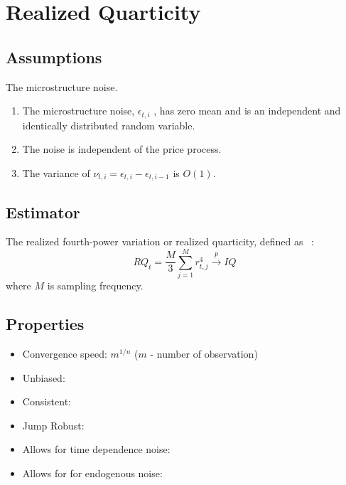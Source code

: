 \documentclass[letterpaper]{report}
\begin{document}
\section{Realized Quarticity}
\subsection{Assumptions}
The microstructure noise.
\begin{enumerate}
\item The microstructure noise, $\epsilon_{t,i}$ , has zero mean and is an
independent and identically distributed random variable.
\item The noise is independent of the price process.
\item The variance of $\nu_{t,i} = \epsilon_{t,i} - \epsilon_{t,i-1}$ is
$O(1)$.
\end{enumerate}
\subsection{Estimator}
The realized fourth-power variation or realized quarticity, defined as
~\cite[Corsi et al., 2005]{Corsi_Kretschmer_Mittnik_Pigorsch}:
\begin{equation}
\label{RQ}
RQ_t = \frac{M}{3} \sum_{j=1}^M r^4_{t,j} \stackrel{p}{\to} IQ
\end{equation}
where $M$ is sampling frequency.
\subsection{Properties}
\begin{itemize}
\item Convergence speed: $m^{1/n}$ ($m$ - number of observation)
\item Unbiased:
\item Consistent:
\item Jump Robust:
\item Allows for time dependence noise:
\item Allows for for endogenous noise:
\end{itemize} 
 
\end{document}
